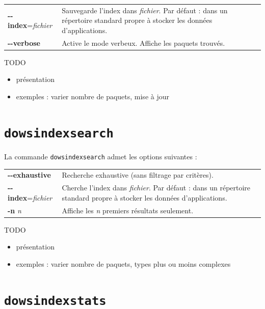 \documentclass[a4paper]{report}
\theoremstyle{definition}
\newcommand{\dowsindex}{\texttt{dowsindex}\xspace}
\begin{document}
\begin{table}[h]
\begin{tabularx}{\textwidth}{lX}
		\textbf{-{}-index}=\textit{fichier} &
		Sauvegarde l'index dans \textit{fichier}. Par défaut : dans un répertoire standard propre à stocker les données d'applications.
	\\
		\textbf{-{}-verbose} &
		Active le mode verbeux. Affiche les paquets trouvés.
\end{tabularx}
\end{table}

TODO
\begin{itemize}
	\item présentation
	\item exemples : varier nombre de paquets, mise à jour
\end{itemize}


\section{\dowsindex \texttt{search}}

La commande \dowsindex \texttt{search} admet les options suivantes :

\begin{table}[h]
\begin{tabularx}{\textwidth}{lX}
		\textbf{-{}-exhaustive} &
		Recherche exhaustive (sans filtrage par critères).
	\\
		\textbf{-{}-index}=\textit{fichier} &
		Cherche l'index dans \textit{fichier}. Par défaut : dans un répertoire standard propre à stocker les données d'applications.
	\\
		\textbf{-n} \textit{n} &
		Affiche les \textit{n} premiers résultats seulement.
\end{tabularx}
\end{table}

TODO
\begin{itemize}
	\item présentation
	\item exemples : varier nombre de paquets, types plus ou moins complexes
\end{itemize}


\section{\dowsindex \texttt{stats}}
\end{document}

